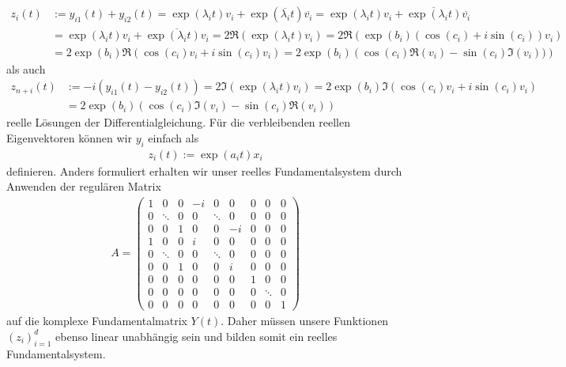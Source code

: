 \begin{solution}
\begin{itemize}
  \begin{align*}
    z_i(t) &:= y_{i1}(t) + y_{i2}(t) = \exp(\lambda_i t)v_i + \exp(\overline{\lambda_i} t)\overline{v_i}
    = \exp(\lambda_i t)v_i + \overline{\exp(\lambda_i t)}\overline{v_i}
    \\
    &= \exp(\lambda_i t)v_i + \overline{\exp(\lambda_i t)v_i}
    = 2\mathfrak{R}(\exp(\lambda_i t)v_i)
    = 2\mathfrak{R}(\exp(b_i)(\cos(c_i)+i\sin(c_i))v_i) \\
    &= 2\exp(b_i)\mathfrak{R}(\cos(c_i)v_i+i\sin(c_i)v_i)
    = 2\exp(b_i)\left(\cos(c_i)\mathfrak{R}(v_i) - \sin(c_i)\mathfrak{I}(v_i))\right)
  \end{align*}
  als auch
  \begin{align*}
    z_{n+i}(t) &:= -i(y_{i1}(t) - y_{i2}(t)) = 2\mathfrak{I}(\exp(\lambda_i t)v_i)
    = 2\exp(b_i)\mathfrak{I}(\cos(c_i)v_i+i\sin(c_i)v_i) \\
    &= 2\exp(b_i)\left(\cos(c_i)\mathfrak{I}(v_i) - \sin(c_i)\mathfrak{R}(v_i)\right)
  \end{align*}
  reelle Lösungen der Differentialgleichung.
  Für die verbleibenden reellen Eigenvektoren können wir $y_i$ einfach als
  \begin{align*}
    z_i(t) := \exp(a_i t)x_i
  \end{align*}
  definieren. Anders formuliert erhalten wir unser reelles Fundamentalsystem
  durch Anwenden der regulären Matrix
  \begin{align*}
    A = \begin{pmatrix}
      1 & 0 & 0 & -i & 0 & 0 & 0 & 0 & 0\\
      0 & \ddots & 0 & 0 & \ddots & 0 & 0 & 0 & 0\\
      0 & 0 & 1 & 0 & 0 & -i & 0 & 0 & 0\\
      1 & 0 & 0 & i & 0 & 0 & 0 & 0 & 0\\
      0 & \ddots & 0 & 0 & \ddots & 0 & 0 & 0 & 0\\
      0 & 0 & 1 & 0 & 0 & i & 0 & 0 & 0\\
      0 & 0 & 0 & 0 & 0 & 0 & 1 & 0 & 0 \\
      0 & 0 & 0 & 0 & 0 & 0 & 0 & \ddots & 0 \\
      0 & 0 & 0 & 0 & 0 & 0 & 0 & 0 & 1
    \end{pmatrix}
  \end{align*}
  auf die komplexe Fundamentalmatrix $Y(t)$. Daher müssen unsere Funktionen $(z_i)_{i=1}^d$
  ebenso linear unabhängig sein und bilden somit ein reelles Fundamentalsystem.
\end{itemize}
\end{solution}

